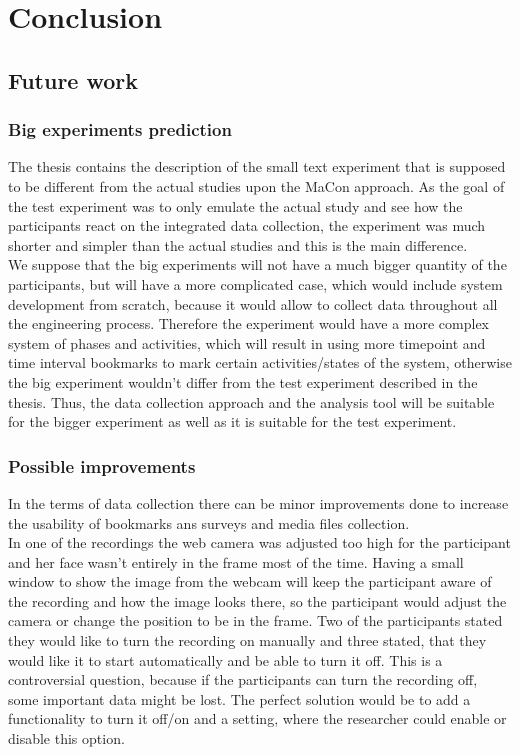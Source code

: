 
\chapter{Conclusion}\label{chapter:conclusion}

\section{Future work}
\subsection{Big experiments prediction}
The thesis contains the description of the small text experiment that is supposed to be different from the actual studies upon the MaCon approach. As the goal of the test experiment was to only emulate the actual study and see how the participants react on the integrated data collection, the experiment was much shorter and simpler than the actual studies and this is the main difference.\\  

We suppose that the big experiments will not have a much bigger quantity of the participants, but will have a more complicated case, which would include system development from scratch, because it would allow to collect data throughout all the engineering process. Therefore the experiment would have a more complex system of phases and activities, which will result in using more timepoint and time interval bookmarks to mark certain activities/states of the system, otherwise the big experiment wouldn't differ from the test experiment described in the thesis. Thus, the data collection approach and the analysis tool will be suitable for the bigger experiment as well as it is suitable for the test experiment. \\

\subsection{Possible improvements}
In the terms of data collection there can be minor improvements done to increase the usability of bookmarks ans surveys and media files collection. \\

In one of the recordings the web camera was adjusted too high for the participant and her face wasn't entirely in the frame most of the time. Having a small window to show the image from the webcam will keep the participant aware of the recording and how the image looks there, so the participant would adjust the camera or change the position to be in the frame. Two of the participants stated they would like to turn the recording on manually and three stated, that they would like it to start automatically and be able to turn it off. This is a controversial question, because if the participants can turn the recording off, some important data might be lost. The perfect solution would be to add a functionality to turn it off/on and a setting, where the researcher could enable or disable this option.\\

